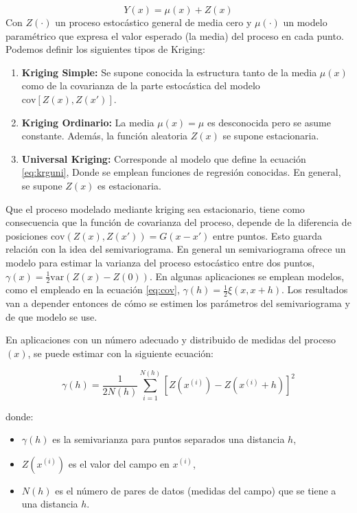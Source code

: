 \documentclass[10pt,a4paper]{report}
\begin{document}
\begin{equation*}
	Y(x) = \mu(x) + Z(x)
\end{equation*} 
Con $Z(\cdot)$ un proceso estocástico general de media cero y $\mu(\cdot)$ un modelo paramétrico que expresa el valor esperado (la media) del proceso en cada punto. Podemos definir los siguientes tipos de Kriging:
\begin{enumerate}
	\item \textbf{Kriging Simple:} Se supone conocida la estructura tanto de la media $\mu(x)$ como de la covarianza de la parte estocástica del modelo $\text{cov}[Z(x),Z(x')]$. 
	
	\item \textbf{Kriging Ordinario:} La media $\mu(x) = \mu$ es desconocida pero se asume constante. Además, la función aleatoria $Z(x)$ se supone estacionaria.
	
	\item \textbf{Universal Kriging:} Corresponde al modelo que define la ecuación \ref{eq:krguni}, Donde se emplean funciones de regresión conocidas. En general, se supone $Z(x)$ es estacionaria.
	
\end{enumerate}

Que el proceso modelado mediante kriging sea estacionario, tiene como consecuencia que la función de covarianza del proceso, depende de la diferencia de posiciones $\text{cov}(Z(x),Z(x')) = G(x-x')$ entre puntos. Esto guarda relación con la idea del semivariograma. En general un semivariograma ofrece un modelo para estimar la varianza del proceso estocástico entre dos puntos, $\gamma(x) = \frac{1}{2}\text{var}(Z(x)-Z(0))$. En algunas aplicaciones se emplean modelos, como el empleado en la ecuación \ref{eq:cov}, $\gamma(h) = \frac{1}{2}\xi(x,x+h)$. Los resultados van a depender entonces de cómo se estimen los parámetros del semivariograma y de que modelo se use.

En aplicaciones con un número adecuado y distribuido de medidas del proceso $(x)$, se puede estimar con la siguiente ecuación:

\[
\gamma(h) = \frac{1}{2N(h)} \sum_{i=1}^{N(h)} [Z(x^{(i)}) - Z(x^{(i)} + h)]^2
\]  

donde:
\begin{itemize}
	\item \( \gamma(h) \) es la semivarianza para puntos separados una distancia \( h \),
	\item \( Z(x^{(i)}) \) es el valor del campo en \( x^{(i)} \),
	\item \( N(h) \) es el número de pares de datos (medidas del campo) que se  tiene a una distancia \( h \).
\end{itemize}
\end{document}
